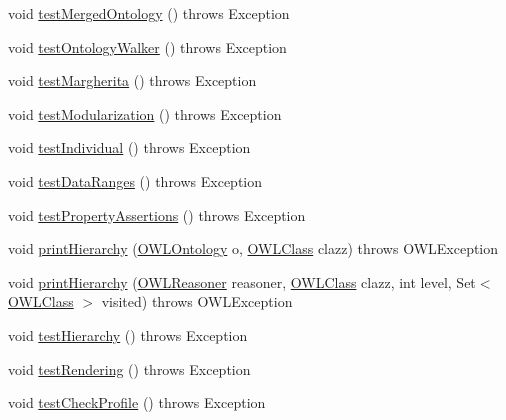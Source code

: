 \begin{DoxyCompactItemize}
\item 
void \hyperlink{classuk_1_1ac_1_1manchester_1_1owl_1_1owlapi_1_1tutorialowled2011_1_1_tutorial_snippets_a3aec74a2f73d391edc244b71f8cc55e8}{test\-Merged\-Ontology} ()  throws Exception 
\item 
void \hyperlink{classuk_1_1ac_1_1manchester_1_1owl_1_1owlapi_1_1tutorialowled2011_1_1_tutorial_snippets_a1aa9de5da66d020db490025e61715ce0}{test\-Ontology\-Walker} ()  throws Exception 
\item 
void \hyperlink{classuk_1_1ac_1_1manchester_1_1owl_1_1owlapi_1_1tutorialowled2011_1_1_tutorial_snippets_acd06f7411d0e644001285d18dcb4e22c}{test\-Margherita} ()  throws Exception 
\item 
void \hyperlink{classuk_1_1ac_1_1manchester_1_1owl_1_1owlapi_1_1tutorialowled2011_1_1_tutorial_snippets_acd8b5d056f3c7f50b4493f35789f1ab9}{test\-Modularization} ()  throws Exception 
\item 
void \hyperlink{classuk_1_1ac_1_1manchester_1_1owl_1_1owlapi_1_1tutorialowled2011_1_1_tutorial_snippets_ab4c27c372cb6f1c12ff1266195f141e8}{test\-Individual} ()  throws Exception 
\item 
void \hyperlink{classuk_1_1ac_1_1manchester_1_1owl_1_1owlapi_1_1tutorialowled2011_1_1_tutorial_snippets_aa4c00e798d98fd86dbdda958c505706f}{test\-Data\-Ranges} ()  throws Exception 
\item 
void \hyperlink{classuk_1_1ac_1_1manchester_1_1owl_1_1owlapi_1_1tutorialowled2011_1_1_tutorial_snippets_af5b2778069a2e55026f076055627e96d}{test\-Property\-Assertions} ()  throws Exception 
\item 
void \hyperlink{classuk_1_1ac_1_1manchester_1_1owl_1_1owlapi_1_1tutorialowled2011_1_1_tutorial_snippets_a7a8c31e247cdf6298cff55c63977bc18}{print\-Hierarchy} (\hyperlink{interfaceorg_1_1semanticweb_1_1owlapi_1_1model_1_1_o_w_l_ontology}{O\-W\-L\-Ontology} o, \hyperlink{interfaceorg_1_1semanticweb_1_1owlapi_1_1model_1_1_o_w_l_class}{O\-W\-L\-Class} clazz)  throws O\-W\-L\-Exception 
\item 
void \hyperlink{classuk_1_1ac_1_1manchester_1_1owl_1_1owlapi_1_1tutorialowled2011_1_1_tutorial_snippets_a2e83824e9b5735f7fc313420086a3b52}{print\-Hierarchy} (\hyperlink{interfaceorg_1_1semanticweb_1_1owlapi_1_1reasoner_1_1_o_w_l_reasoner}{O\-W\-L\-Reasoner} reasoner, \hyperlink{interfaceorg_1_1semanticweb_1_1owlapi_1_1model_1_1_o_w_l_class}{O\-W\-L\-Class} clazz, int level, Set$<$ \hyperlink{interfaceorg_1_1semanticweb_1_1owlapi_1_1model_1_1_o_w_l_class}{O\-W\-L\-Class} $>$ visited)  throws O\-W\-L\-Exception 
\item 
void \hyperlink{classuk_1_1ac_1_1manchester_1_1owl_1_1owlapi_1_1tutorialowled2011_1_1_tutorial_snippets_a27925104081b79d5e71baf1e7d5e834b}{test\-Hierarchy} ()  throws Exception 
\item 
void \hyperlink{classuk_1_1ac_1_1manchester_1_1owl_1_1owlapi_1_1tutorialowled2011_1_1_tutorial_snippets_a6cc01e35d2bd5212dc4da75f4400a48b}{test\-Rendering} ()  throws Exception 
\item 
void \hyperlink{classuk_1_1ac_1_1manchester_1_1owl_1_1owlapi_1_1tutorialowled2011_1_1_tutorial_snippets_a243770639b5fa0e17acc13ec34734191}{test\-Check\-Profile} ()  throws Exception 
\end{DoxyCompactItemize}
